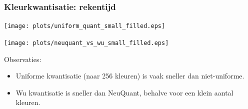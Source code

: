 \documentclass[dutch]{beamer}
\theoremstyle{definition}
\newtheorem{definitie}[theorem]{Definitie}
\theoremstyle{remark}
\theoremstyle{example}
\begin{document}
\frame
{
  \frametitle{Kleurkwantisatie: rekentijd}
  
  \begin{center}
  \begin{minipage}[t]{0.45\textwidth}
  \vspace{0pt}
  \centering
  \texttt{[image: plots/uniform\_quant\_small\_filled.eps]}
  \end{minipage}
  \begin{minipage}[t]{0.45\textwidth}
  \vspace{0pt}
  \centering
  \texttt{[image: plots/neuquant\_vs\_wu\_small\_filled.eps]}
  \end{minipage}
  \end{center}

  Observaties:
  \begin{itemize}
    \item Uniforme kwantisatie (naar 256 kleuren) is vaak sneller dan niet-uniforme.
    \item Wu kwantisatie is sneller dan NeuQuant, behalve voor een klein aantal kleuren.
  \end{itemize}
}
% 
\end{document}
